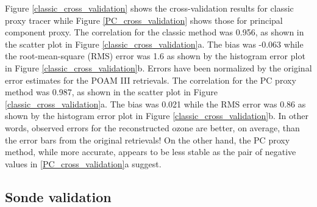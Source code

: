 \documentclass{article}
\begin{document}
Figure \ref{classic_cross_validation} shows the cross-validation results
for classic proxy tracer while Figure \ref{PC_cross_validation} shows
those for principal component proxy.
The correlation for the classic method was 0.956, as shown in 
the scatter plot in Figure \ref{classic_cross_validation}a.
The bias was -0.063 while the root-mean-square (RMS) error was 1.6 as shown by
the histogram error plot in Figure \ref{classic_cross_validation}b.
Errors have been normalized by the original error estimates for the
POAM III retrievals.
The correlation for the PC proxy method was 0.987, as shown in 
the scatter plot in Figure \ref{classic_cross_validation}a.
The bias was 0.021 while the RMS error was 0.86 as shown by
the histogram error plot in Figure \ref{classic_cross_validation}b.
In other words, observed errors for the reconstructed ozone are better,
on average, than the error bars from the original retrievals!
On the other hand, the PC proxy method, while more accurate, appears to be
less stable as the pair of negative values in \ref{PC_cross_validation}a
suggest.

\subsection{Sonde validation}
\end{document}
